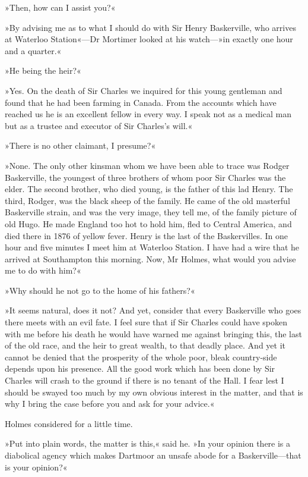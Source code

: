 »Then, how can I assist you?«

»By advising me as to what I should do with Sir Henry Baskerville, who arrives at Waterloo Station«\allowbreak---\allowbreak Dr Mortimer looked at his watch\allowbreak---\allowbreak  »in exactly one hour and a quarter.«

»He being the heir?«

»Yes. On the death of Sir Charles we inquired for this young gentleman and found that he had been farming in Canada. From the accounts which have reached us he is an excellent fellow in every way. I speak not as a medical man but as a trustee and executor of Sir Charles's will.«

»There is no other claimant, I presume?«

»None. The only other kinsman whom we have been able to trace was Rodger Baskerville, the youngest of three brothers of whom poor Sir Charles was the elder. The second brother, who died young, is the father of this lad Henry. The third, Rodger, was the black sheep of the family. He came of the old masterful Baskerville strain, and was the very image, they tell me, of the family picture of old Hugo. He made England too hot to hold him, fled to Central America, and died there in 1876 of yellow fever. Henry is the last of the Baskervilles. In one hour and five minutes I meet him at Waterloo Station. I have had a wire that he arrived at Southampton this morning. Now, Mr Holmes, what would you advise me to do with him?«

»Why should he not go to the home of his fathers?«

»It seems natural, does it not? And yet, consider that every Baskerville who goes there meets with an evil fate. I feel sure that if Sir Charles could have spoken with me before his death he would have warned me against bringing this, the last of the old race, and the heir to great wealth, to that deadly place. And yet it cannot be denied that the prosperity of the whole poor, bleak country-side depends upon his presence. All the good work which has been done by Sir Charles will crash to the ground if there is no tenant of the Hall. I fear lest I should be swayed too much by my own obvious interest in the matter, and that is why I bring the case before you and ask for your advice.«

Holmes considered for a little time.

»Put into plain words, the matter is this,« said he. »In your opinion there is a diabolical agency which makes Dartmoor an unsafe abode for a Baskerville\allowbreak---\allowbreak that is your opinion?«

